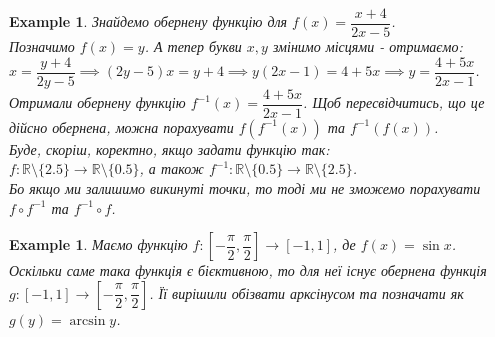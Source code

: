 \documentclass[a4paper, 14pt]{article}
\theoremstyle{theoremdd}
\theoremstyle{theoremdd}
\theoremstyle{theoremdd}
\theoremstyle{theoremdd}
\newtheorem{example}[theorem]{Example}
\theoremstyle{theoremdd}
\theoremstyle{theoremdd}
\theoremstyle{theoremdd}
\theoremstyle{theoremdd}
\begin{document}
	\begin{example} Знайдемо обернену функцію для $f(x) = \dfrac{x+4}{2x-5}$.\\
	Позначимо $f(x) = y$. А тепер букви $x,y$ змінимо місцями - отримаємо:\\
	$x = \dfrac{y+4}{2y-5} \implies (2y-5)x = y+4 \implies y(2x-1) = 4+5x \implies y = \dfrac{4+5x}{2x-1}$.\\
	Отримали обернену функцію $f^{-1}(x) = \dfrac{4+5x}{2x-1}$.	Щоб пересвідчитись, що це дійсно обернена, можна порахувати $f(f^{-1}(x))$ та $f^{-1}(f(x))$.
	\bigskip \\
	Буде, скоріш, коректно, якщо задати функцію так: \\ $f \colon \mathbb{R} \setminus \{2.5\} \to \mathbb{R} \setminus \{0.5\}$, а також $f^{-1} \colon \mathbb{R} \setminus \{0.5\} \to \mathbb{R} \setminus \{2.5\}$.\\ 
	Бо якщо ми залишимо викинуті точки, то тоді ми не зможемо порахувати $f \circ f^{-1}$ та $f^{-1} \circ f$.
	\end{example}
	
	\begin{example}
	Маємо функцію $f \colon \left[ -\dfrac{\pi}{2}, \dfrac{\pi}{2} \right] \to [-1,1]$, де $f(x) = \sin x$.\\
	Оскільки саме така функція є бієктивною, то для неї існує обернена функція $g: [-1,1] \to \left[ -\dfrac{\pi}{2}, \dfrac{\pi}{2} \right]$. Її вирішили обізвати арксінусом та позначати як $g(y) = \arcsin y$.
	\end{example}
	
\end{document}
